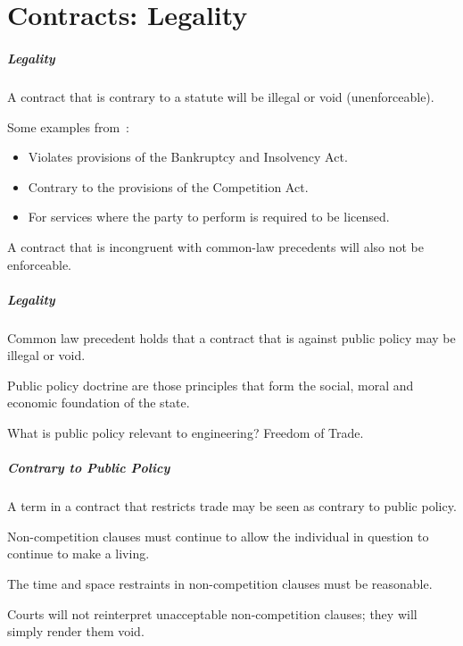 \part{Contracts: Legality}

\begin{frame}
\partpage
\end{frame}



\begin{frame}
\frametitle{Legality}

A contract that is contrary to a statute will be illegal or void (unenforceable).

Some examples from~\cite{lpe}:
\begin{itemize}
	\item Violates provisions of the Bankruptcy and Insolvency Act.
	\item Contrary to the provisions of the Competition Act.
	\item For services where the party  to perform is required to be licensed.
\end{itemize}

A contract that is incongruent with common-law precedents will also not be enforceable.

\end{frame}



\begin{frame}
\frametitle{Legality}

Common law precedent holds that a contract that is against public policy may be illegal or void.

Public policy doctrine are those principles that form the social, moral and economic foundation of the state.

What is public policy relevant to engineering? Freedom of Trade.

\end{frame}



\begin{frame}
\frametitle{Contrary to Public Policy}

A term in a contract that restricts trade may be seen as contrary to public policy.

Non-competition clauses must continue to allow the individual in question to continue to make a living.

The time and space restraints in non-competition clauses must be reasonable.

Courts will not reinterpret unacceptable non-competition clauses; they will simply render them void.

\end{frame}



